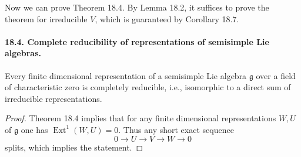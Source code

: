 Now we can prove Theorem 18.4. By Lemma 18.2, it suffices to prove the theorem for irreducible $V$, which is guaranteed by Corollary 18.7.

\paragraph{18.4. Complete reducibility of representations of semisimple Lie algebras.}
\begin{theorem}[18.9]
Every finite dimensional representation of a semisimple Lie algebra $\mathfrak g$ over a field of characteristic zero is completely reducible, i.e., isomorphic to a direct sum of irreducible representations.
\end{theorem}
\begin{proof}
Theorem 18.4 implies that for any finite dimensional representations $W,U$ of $\mathfrak g$ one has $\operatorname{Ext}^1(W,U)=0$. Thus any short exact sequence
\[
0\to U\to V\to W\to0
\]
splits, which implies the statement.
\end{proof}
